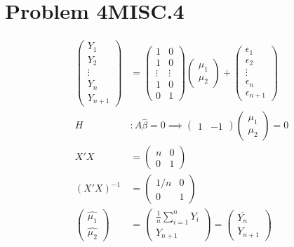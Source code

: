 \documentclass[a4paper]{article}
\begin{document}
\section*{Problem 4MISC.4}
\begin{align*}
\begin{pmatrix} 
Y_1\\
Y_2\\
\vdots\\
Y_n\\
Y_{n+1}
\end{pmatrix}&= \begin{pmatrix}
1 & 0\\
1 & 0\\
\vdots & \vdots\\
1 & 0\\
0 & 1
\end{pmatrix}\begin{pmatrix}\mu_1 \\ \mu_2
\end{pmatrix}+ \begin{pmatrix} \epsilon_1\\
\epsilon_2\\
\vdots\\
\epsilon_n\\
\epsilon_{n+1}
\end{pmatrix}\\
H &:  A\hat{\beta} = 0 \implies \begin{pmatrix}1 & -1\end{pmatrix}\begin{pmatrix}\mu_1\\
\mu_2
\end{pmatrix} = 0 \\
X'X &= \begin{pmatrix}n & 0 \\ 0 & 1 \end{pmatrix}\\
(X'X)^{-1} &= \begin{pmatrix}1/n & 0 \\ 0 & 1 \end{pmatrix}\\
\begin{pmatrix}\hat{\mu_1}\\
\hat{\mu_2}
\end{pmatrix} &= \begin{pmatrix}\frac{1}{n}\sum_{i=1}^nY_i\\
Y_{n+1}
\end{pmatrix} = \begin{pmatrix} \bar{Y_n} \\ Y_{n+1}\end{pmatrix}\\ 

\end{align*}
\end{document}
